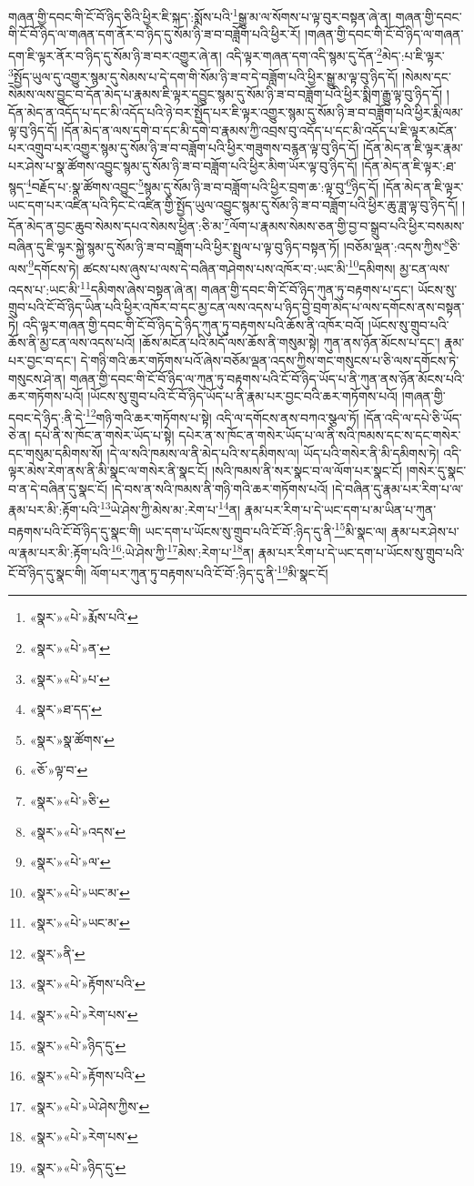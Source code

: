 གཞན་གྱི་དབང་གི་ངོ་བོ་ཉིད་ཅིའི་ཕྱིར་ཇི་སྐད་:སྨོས་པའི་\footnote{«སྣར་»«པེ་»རྨོས་པའི་}སྒྱུ་མ་ལ་སོགས་པ་ལྟ་བུར་བསྟན་ཞེ་ན། གཞན་གྱི་དབང་གི་ངོ་བོ་ཉིད་ལ་གཞན་དག་ནོར་བ་ཉིད་དུ་སོམ་ཉི་ཟ་བ་བཟློག་པའི་ཕྱིར་རོ། །གཞན་གྱི་དབང་གི་ངོ་བོ་ཉིད་ལ་གཞན་དག་ཇི་ལྟར་ནོར་བ་ཉིད་དུ་སོམ་ཉི་ཟ་བར་འགྱུར་ཞེ་ན། འདི་ལྟར་གཞན་དག་འདི་སྙམ་དུ་དོན་\footnote{«སྣར་»«པེ་»ན་}མེད་:པ་ཇི་ལྟར་\footnote{«སྣར་»«པེ་»པ་}སྤྱོད་ཡུལ་དུ་འགྱུར་སྙམ་དུ་སེམས་པ་དེ་དག་གི་སོམ་ཉི་ཟ་བ་དེ་བཟློག་པའི་ཕྱིར་སྒྱུ་མ་ལྟ་བུ་ཉིད་དོ། །སེམས་དང་སེམས་ལས་བྱུང་བ་དོན་མེད་པ་རྣམས་ཇི་ལྟར་དབྱུང་སྙམ་དུ་སོམ་ཉི་ཟ་བ་བཟློག་པའི་ཕྱིར་སྨིག་རྒྱུ་ལྟ་བུ་ཉིད་དོ། །དོན་མེད་ན་འདོད་པ་དང་མི་འདོད་པའི་ཉེ་བར་སྤྱོད་པར་ཇི་ལྟར་འགྱུར་སྙམ་དུ་སོམ་ཉི་ཟ་བ་བཟློག་པའི་ཕྱིར་རྨི་ལམ་ལྟ་བུ་ཉིད་དོ། །དོན་མེད་ན་ལས་དགེ་བ་དང་མི་དགེ་བ་རྣམས་ཀྱི་འབྲས་བུ་འདོད་པ་དང་མི་འདོད་པ་ཇི་ལྟར་མངོན་པར་འགྲུབ་པར་འགྱུར་སྙམ་དུ་སོམ་ཉི་ཟ་བ་བཟློག་པའི་ཕྱིར་གཟུགས་བརྙན་ལྟ་བུ་ཉིད་དོ། །དོན་མེད་ན་ཇི་ལྟར་རྣམ་པར་ཤེས་པ་སྣ་ཚོགས་འབྱུང་སྙམ་དུ་སོམ་ཉི་ཟ་བ་བཟློག་པའི་ཕྱིར་མིག་ཡོར་ལྟ་བུ་ཉིད་དོ། །དོན་མེད་ན་ཇི་ལྟར་:ཐ་སྙད་\footnote{«སྣར་»ཐ་དད་}བརྗོད་པ་:སྣ་ཚོགས་འབྱུང་\footnote{«སྣར་»སྣ་ཚོགས་}སྙམ་དུ་སོམ་ཉི་ཟ་བ་བཟློག་པའི་ཕྱིར་བྲག་ཆ་:ལྟ་བུ་\footnote{«ཅོ་»ལྟ་བ་}ཉིད་དོ། །དོན་མེད་ན་ཇི་ལྟར་ཡང་དག་པར་འཛིན་པའི་ཏིང་ངེ་འཛིན་གྱི་སྤྱོད་ཡུལ་འབྱུང་སྙམ་དུ་སོམ་ཉི་ཟ་བ་བཟློག་པའི་ཕྱིར་ཆུ་ཟླ་ལྟ་བུ་ཉིད་དོ། །དོན་མེད་ན་བྱང་ཆུབ་སེམས་དཔའ་སེམས་ཕྱིན་:ཅི་མ་\footnote{«སྣར་»«པེ་»ཅི་}ལོག་པ་རྣམས་སེམས་ཅན་གྱི་བྱ་བ་སྒྲུབ་པའི་ཕྱིར་བསམས་བཞིན་དུ་ཇི་ལྟར་སྐྱེ་སྙམ་དུ་སོམ་ཉི་ཟ་བ་བཟློག་པའི་ཕྱིར་སྤྲུལ་པ་ལྟ་བུ་ཉིད་བསྟན་ཏོ། །བཅོམ་ལྡན་:འདས་ཀྱིས་\footnote{«སྣར་»«པེ་»འདས་}ཅི་ལས་\footnote{«སྣར་»«པེ་»ལ་}དགོངས་ཏེ། ཚངས་པས་ཞུས་པ་ལས་དེ་བཞིན་གཤེགས་པས་འཁོར་བ་:ཡང་མི་\footnote{«སྣར་»«པེ་»ཡང་མ་}དམིགས། མྱ་ངན་ལས་འདས་པ་:ཡང་མི་\footnote{«སྣར་»«པེ་»ཡང་མ་}དམིགས་ཞེས་བསྟན་ཞེ་ན། གཞན་གྱི་དབང་གི་ངོ་བོ་ཉིད་ཀུན་ཏུ་བརྟགས་པ་དང་། ཡོངས་སུ་གྲུབ་པའི་ངོ་བོ་ཉིད་ཡིན་པའི་ཕྱིར་འཁོར་བ་དང་མྱ་ངན་ལས་འདས་པ་ཉིད་བྱེ་བྲག་མེད་པ་ལས་དགོངས་ནས་བསྟན་ཏེ། འདི་ལྟར་གཞན་གྱི་དབང་གི་ངོ་བོ་ཉིད་དེ་ཉིད་ཀུན་ཏུ་བརྟགས་པའི་ཆོས་ནི་འཁོར་བའོ། །ཡོངས་སུ་གྲུབ་པའི་ཆོས་ནི་མྱ་ངན་ལས་འདས་པའོ། །ཆོས་མངོན་པའི་མདོ་ལས་ཆོས་ནི་གསུམ་སྟེ། ཀུན་ནས་ཉོན་མོངས་པ་དང་། རྣམ་པར་བྱང་བ་དང་། དེ་གཉི་གའི་ཆར་གཏོགས་པའོ་ཞེས་བཅོམ་ལྡན་འདས་ཀྱིས་གང་གསུངས་པ་ཅི་ལས་དགོངས་ཏེ་གསུངས་ཤེ་ན། གཞན་གྱི་དབང་གི་ངོ་བོ་ཉིད་ལ་ཀུན་ཏུ་བརྟགས་པའི་ངོ་བོ་ཉིད་ཡོད་པ་ནི་ཀུན་ནས་ཉོན་མོངས་པའི་ཆར་གཏོགས་པའོ། །ཡོངས་སུ་གྲུབ་པའི་ངོ་བོ་ཉིད་ཡོད་པ་ནི་རྣམ་པར་བྱང་བའི་ཆར་གཏོགས་པའོ། །གཞན་གྱི་དབང་དེ་ཉིད་:ནི་དེ་\footnote{«སྣར་»ནི་}གཉི་གའི་ཆར་གཏོགས་པ་སྟེ། འདི་ལ་དགོངས་ནས་བཀའ་སྩལ་ཏོ། །དོན་འདི་ལ་དཔེ་ཅི་ཡོད་ཅེ་ན། དཔེ་ནི་ས་ཁོང་ན་གསེར་ཡོད་པ་སྟེ། དཔེར་ན་ས་ཁོང་ན་གསེར་ཡོད་པ་ལ་ནི་སའི་ཁམས་དང་ས་དང་གསེར་དང་གསུམ་དམིགས་སོ། །དེ་ལ་སའི་ཁམས་ལ་ནི་མེད་པའི་ས་དམིགས་ལ། ཡོད་པའི་གསེར་ནི་མི་དམིགས་ཏེ། འདི་ལྟར་མེས་རེག་ནས་ནི་མི་སྣང་ལ་གསེར་ནི་སྣང་ངོ། །སའི་ཁམས་ནི་སར་སྣང་བ་ལ་ལོག་པར་སྣང་ངོ། །གསེར་དུ་སྣང་བ་ན་དེ་བཞིན་དུ་སྣང་ངོ། །དེ་བས་ན་སའི་ཁམས་ནི་གཉི་གའི་ཆར་གཏོགས་པའོ། །དེ་བཞིན་དུ་རྣམ་པར་རིག་པ་ལ་རྣམ་པར་མི་:རྟོག་པའི་\footnote{«སྣར་»«པེ་»རྟོགས་པའི་}ཡེ་ཤེས་ཀྱི་མེས་མ་:རེག་པ་\footnote{«སྣར་»«པེ་»རེག་པས་}ན། རྣམ་པར་རིག་པ་དེ་ཡང་དག་པ་མ་ཡིན་པ་ཀུན་བརྟགས་པའི་ངོ་བོ་ཉིད་དུ་སྣང་གི། ཡང་དག་པ་ཡོངས་སུ་གྲུབ་པའི་ངོ་བོ་:ཉིད་དུ་ནི་\footnote{«སྣར་»«པེ་»ཉིད་དུ་}མི་སྣང་ལ། རྣམ་པར་ཤེས་པ་ལ་རྣམ་པར་མི་:རྟོག་པའི་\footnote{«སྣར་»«པེ་»རྟོགས་པའི་}:ཡེ་ཤེས་ཀྱི་\footnote{«སྣར་»«པེ་»ཡེ་ཤེས་ཀྱིས་}མེས་:རེག་པ་\footnote{«སྣར་»«པེ་»རེག་པས་}ན། རྣམ་པར་རིག་པ་དེ་ཡང་དག་པ་ཡོངས་སུ་གྲུབ་པའི་ངོ་བོ་ཉིད་དུ་སྣང་གི། ལོག་པར་ཀུན་ཏུ་བརྟགས་པའི་ངོ་བོ་:ཉིད་དུ་ནི་\footnote{«སྣར་»«པེ་»ཉིད་དུ་}མི་སྣང་ངོ། 